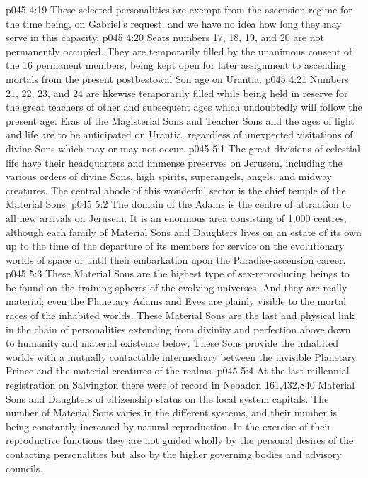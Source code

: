 \vs p045 4:19 \pc These selected personalities are exempt from the ascension regime for the time being, on Gabriel’s request, and we have no idea how long they may serve in this capacity.
\vs p045 4:20 Seats numbers 17, 18, 19, and 20 are not permanently occupied. They are temporarily filled by the unanimous consent of the 16 permanent members, being kept open for later assignment to ascending mortals from the present postbestowal Son age on Urantia.
\vs p045 4:21 Numbers 21, 22, 23, and 24 are likewise temporarily filled while being held in reserve for the great teachers of other and subsequent ages which undoubtedly will follow the present age. Eras of the Magisterial Sons and Teacher Sons and the ages of light and life are to be anticipated on Urantia, regardless of unexpected visitations of divine Sons which may or may not occur.
\vs p045 5:1 The great divisions of celestial life have their headquarters and immense preserves on Jerusem, including the various orders of divine Sons, high spirits, superangels, angels, and midway creatures. The central abode of this wonderful sector is the chief temple of the Material Sons.
\vs p045 5:2 The domain of the Adams is the centre of attraction to all new arrivals on Jerusem. It is an enormous area consisting of 1,000 centres, although each family of Material Sons and Daughters lives on an estate of its own up to the time of the departure of its members for service on the evolutionary worlds of space or until their embarkation upon the Paradise\hyp{}ascension career.
\vs p045 5:3 These Material Sons are the highest type of sex\hyp{}reproducing beings to be found on the training spheres of the evolving universes. And they are really material; even the Planetary Adams and Eves are plainly visible to the mortal races of the inhabited worlds. These Material Sons are the last and physical link in the chain of personalities extending from divinity and perfection above down to humanity and material existence below. These Sons provide the inhabited worlds with a mutually contactable intermediary between the invisible Planetary Prince and the material creatures of the realms.
\vs p045 5:4 \pc At the last millennial registration on Salvington there were of record in Nebadon 161,432,840 Material Sons and Daughters of citizenship status on the local system capitals. The number of Material Sons varies in the different systems, and their number is being constantly increased by natural reproduction. In the exercise of their reproductive functions they are not guided wholly by the personal desires of the contacting personalities but also by the higher governing bodies and advisory councils.
